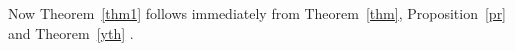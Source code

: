 \documentclass[11pt, reqno]{amsart}    	%
\newtheorem{thm}{Theorem}[section]
\theoremstyle{definition}
\numberwithin{equation}{section}
\begin{document}
	Now Theorem~\ref{thm1} follows immediately from  Theorem~\ref{thm}, Proposition~\ref{pr} and Theorem~\ref{yth} .
	
	\begin{figure}[omitted: a diagram of this paper's results, not reproduced here]\label{fig:1}\end{figure}
	
	
	
	
	
	
	
	
\end{document}
